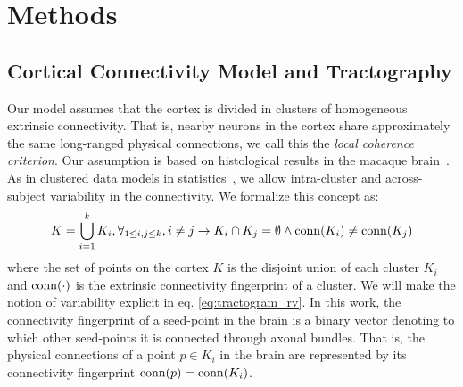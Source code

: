\section{Methods}
%
\subsection{Cortical Connectivity Model and Tractography}
\label{sec:cortical_model}
Our model assumes that the cortex is divided in clusters of homogeneous extrinsic
connectivity. That is, nearby neurons in the cortex share approximately the same
long-ranged physical connections, we call this the \textit{local coherence criterion}.
Our assumption is based on histological results in the macaque brain~\citep{Schmahmann2006}.
As in clustered data models in statistics~\citep{Pendergast1996}, we allow
intra-cluster and across-subject variability in the connectivity. We formalize this concept as:
%
\begin{equation}
    \label{eq:notation}
    K = \bigcup_{i=1}^k K_i , \forall_{1 \leq i,j \leq k}, i \neq j \rightarrow K_i \cap K_j = \emptyset \land \operatorname{conn}(K_i) \neq \operatorname{conn}(K_j)
\end{equation}
%
where the set of points on the cortex $K$ is the disjoint union
of each cluster $K_i$ and $\operatorname{conn}(\cdot)$ is the extrinsic connectivity
fingerprint of a cluster. We will make the notion of variability explicit in eq. 
\ref{eq:tractogram_rv}. In this work, the connectivity fingerprint of a seed-point
in the brain is a binary vector denoting to which other seed-points it is
connected through axonal bundles. That is, the physical connections of a point
$p \in K_i$ in the brain are represented by its connectivity fingerprint
$\operatorname{conn}(p) = \operatorname{conn}(K_i)$.

